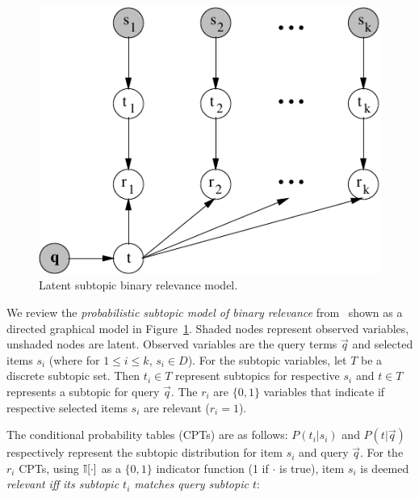 \begin{figure}[t!]
\centerline{\includegraphics[scale = .8]{graphicalModel}}
\vspace{-2mm}
\caption{Latent subtopic binary relevance model.}
\vspace{-3mm}
\label{fig:gm}
\end{figure}

We review the \emph{probabilistic subtopic model of binary relevance}
from~\cite{sanner11} shown as a directed graphical model 
in Figure~\ref{fig:gm}.
Shaded nodes represent observed variables, unshaded nodes are
latent.  Observed variables are the query terms
$\vec{q}$ and selected items $s_i$ (where for $1 \leq i \leq k$, $s_i
\in D$).  For the subtopic variables, let $T$ be a discrete subtopic
set.  Then $t_i \in T$ represent subtopics for respective
$s_i$ and $t \in T$ represents a subtopic for query $\vec{q}$.  The
$r_i$ are $\{ 0,1\}$ variables that indicate if respective selected
items $s_i$ are relevant ($r_i=1$).

The conditional probability tables (CPTs) are as follows: $P(t_i|s_i)$
and $P(t|\vec{q})$ respectively represent the subtopic distribution
for item $s_i$ and query $\vec{q}$.  %
For the $r_i$ CPTs, using $\mathbb{I}[\cdot]$ as a $\{0,1\}$ indicator 
function (1 if $\cdot$ is true), 
item $s_i$ is deemed \emph{relevant}
\emph{iff} \emph{its subtopic $t_i$ matches query subtopic $t$}:

